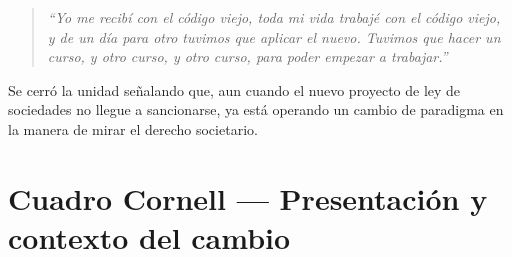 \documentclass[12pt,oneside]{book}
\begin{document}
\begin{quote}
\textit{``Yo me recibí con el código viejo, toda mi vida trabajé con el código viejo, y de un día para otro tuvimos que aplicar el nuevo. Tuvimos que hacer un curso, y otro curso, y otro curso, para poder empezar a trabajar.''}
\end{quote}

Se cerró la unidad señalando que, aun cuando el nuevo proyecto de ley de sociedades no llegue a sancionarse, ya está operando un cambio de paradigma en la manera de mirar el derecho societario.

\section*{Cuadro Cornell — Presentación y contexto del cambio}
\end{document}
